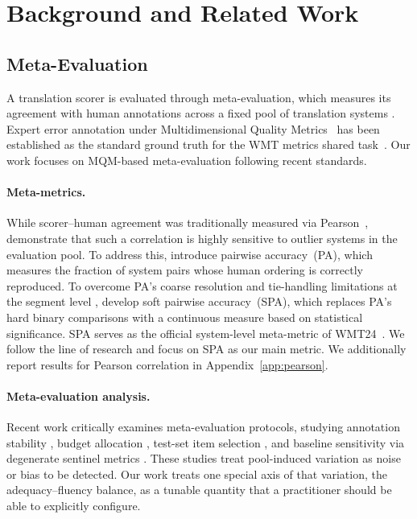 \documentclass[11pt]{article}
\begin{document}
\section{Background and Related Work}

\subsection{Meta-Evaluation}

A translation scorer is evaluated through meta-evaluation, which measures its agreement with human annotations across a fixed pool of translation systems \citep{callison-burch-etal-2007-meta}. Expert error annotation under Multidimensional Quality Metrics~\citep[MQM;][]{mariana2015multidimensional} has been established as the standard ground truth for the WMT metrics shared task~\citep{freitag-etal-2021-experts, freitag-etal-2023-results, kocmi-federmann-2023-large, kocmi-etal-2025-findings-wmt25}. Our work focuses on MQM-based meta-evaluation following recent standards.

\paragraph{Meta-metrics.}
While scorer--human agreement was traditionally measured via Pearson~\cite{machacek-bojar-2013-results, machacek-bojar-2014-results}, \citet{mathur-etal-2020-tangled} demonstrate that such a correlation is highly sensitive to outlier systems in the evaluation pool. To address this, \citet{kocmi-etal-2021-ship} introduce pairwise accuracy~(PA), which measures the fraction of system pairs whose human ordering is correctly reproduced. To overcome PA's coarse resolution and tie-handling limitations at the segment level \citep{deutsch-etal-2023-ties}, \citet{thompson-etal-2024-improving} develop soft pairwise accuracy~(SPA), which replaces PA's hard binary comparisons with a continuous measure based on statistical significance. SPA serves as the official system-level meta-metric of WMT24~\citep{freitag-etal-2024-llms}. We follow the line of research and focus on SPA as our main metric. We additionally report results for Pearson correlation in Appendix~\ref{app:pearson}.

\paragraph{Meta-evaluation analysis.}
Recent work critically examines meta-evaluation protocols, studying annotation stability \citep{knowles-2021-stability}, budget allocation \citep{riley-etal-2024-finding}, test-set item selection \citep{zouhar-etal-2025-select}, and baseline sensitivity via degenerate sentinel metrics \citep{perrella-etal-2024-guardians}. These studies treat pool-induced variation as noise or bias to be detected. Our work treats one special axis of that variation, the adequacy--fluency balance, as a tunable quantity that a practitioner should be able to explicitly configure.
\end{document}
